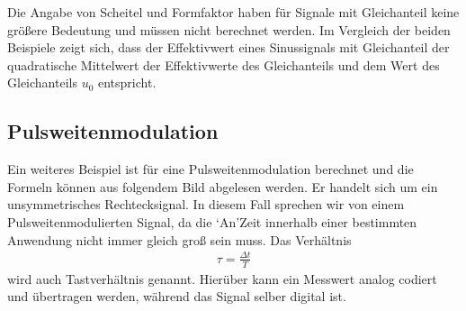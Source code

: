\documentclass[letterpaper,10pt,english]{jupyterBook}
\begin{document}
\sphinxAtStartPar
{}

\sphinxAtStartPar
Die Angabe von Scheitel\sphinxhyphen{} und Formfaktor haben für Signale mit Gleichanteil keine größere Bedeutung und müssen nicht berechnet werden. Im Vergleich der beiden Beispiele zeigt sich, dass der Effektivwert eines Sinussignals mit Gleichanteil der quadratische Mittelwert der Effektivwerte des Gleichanteils und dem Wert des Gleichanteils \(u_0\) entspricht.


\subsection{Pulsweitenmodulation}
\label{\detokenize{content/3_Kenngroessen:pulsweitenmodulation}}
\sphinxAtStartPar


\sphinxAtStartPar
Ein weiteres Beispiel ist für eine Pulsweitenmodulation berechnet und die Formeln können aus folgendem Bild abgelesen werden. Er handelt sich um ein unsymmetrisches Rechtecksignal. In diesem Fall sprechen wir von einem Pulsweitenmodulierten Signal, da die ‘An’\sphinxhyphen{}Zeit innerhalb einer bestimmten Anwendung nicht immer gleich groß sein muss. Das Verhältnis
\begin{equation*}
\begin{split}\tau = \frac{\Delta t}{T}\end{split}
\end{equation*}
\sphinxAtStartPar
wird auch Tastverhältnis genannt. Hierüber kann ein Messwert analog codiert und übertragen werden, während das Signal selber digital ist.

\sphinxAtStartPar
{}

\sphinxstepscope
\end{document}

